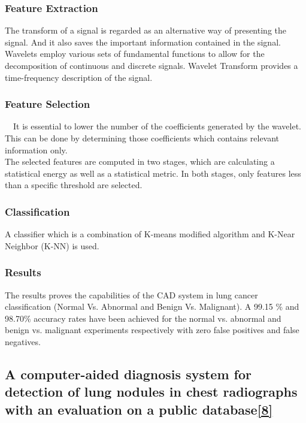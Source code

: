 \documentclass[hidelinks,12pt]{article}
\begin{document}
\subsubsection{Feature Extraction}

The transform of a signal is regarded as an alternative way of presenting the signal. And it also saves the important information contained in the signal. Wavelets employ various sets of fundamental functions to allow for the decomposition of continuous and discrete signals. Wavelet Transform provides a time-frequency description of the signal.


\subsubsection{Feature Selection}

$\quad$It is essential to lower the number of the coefficients generated by the wavelet. This can be done by determining those coefficients which contains relevant information only.\\

The selected features are computed in two stages, which are calculating a statistical energy as well as a statistical metric. In both stages, only features less than a specific threshold are selected.


\subsubsection{Classification}
A classifier which is a combination of K-means modified algorithm and K-Near Neighbor (K-NN) is used.

\subsubsection{Results}

The results proves the capabilities of the CAD system in lung cancer classification (Normal Vs. Abnormal and Benign Vs. Malignant). A 99.15 \% and 98.70\% accuracy rates have been achieved for the normal vs. abnormal and benign vs. malignant experiments respectively with zero 
false positives and false negatives.

\newpage

\subsection{A computer-aided diagnosis system for detection of lung nodules in chest radiographs with an evaluation on a public database\hyperref[8]{[8]}}
\end{document}
